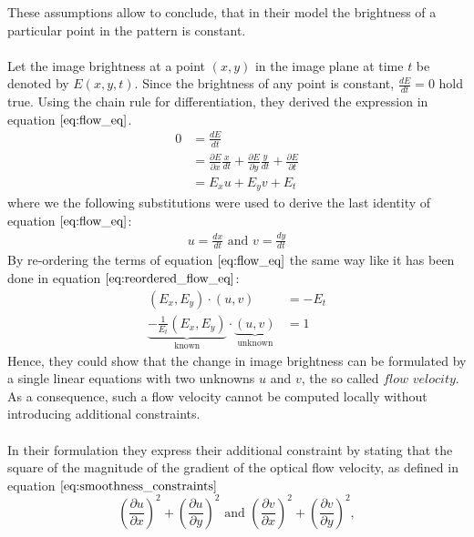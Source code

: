 These assumptions allow to conclude, that in their model the brightness of a particular point in the pattern is constant. \\ \\
Let the image brightness at a point $(x,y)$ in the image plane at time $t$ be denoted by $E(x,y,t)$. Since the brightness of any point is constant, $\frac{d E}{dt} = 0$ hold true. Using the chain rule for differentiation, they derived the expression in equation $\ref{eq:flow_eq}$.  
\begin{equation}
\begin{aligned}
0 &= \frac{d E}{dt} \\
&= \frac{\partial E}{\partial x} \frac{x}{dt} + \frac{\partial E}{\partial y} \frac{y}{dt} + \frac{\partial E}{\partial t} \\
&= E_{x} u + E_{y} v + E_{t}
\end{aligned}
\label{eq:flow_eq}	
\end{equation}
where we the following substitutions were used to derive the last identity of equation $\ref{eq:flow_eq}$:
\begin{equation}
\begin{aligned}
	u = \frac{dx}{dt} \text{ and } v = \frac{dy}{dt}
\end{aligned}
\end{equation}
By re-ordering the terms of equation $\ref{eq:flow_eq}$ the same way like it has been done in equation $\ref{eq:reordered_flow_eq}$:
\begin{equation}
\begin{aligned}
	(E_x, E_y) \cdot (u, v) &= -E_t \\
	\underbrace{-\frac{1}{E_t}\left( E_x, E_y \right)}_\text{known} \cdot \underbrace{(u, v)}_\text{unknown} &= 1
\end{aligned}
\label{eq:reordered_flow_eq}
\end{equation}
Hence, they could show that the change in image brightness can be formulated by a single linear equations with two unknowns $u$ and $v$, the so called $\textit{flow velocity}$. As a consequence, such a flow velocity cannot be computed locally without introducing additional constraints. \\ \\
In their formulation they express their additional constraint by stating that the square of the magnitude of the gradient of the optical flow velocity, as defined in equation $\ref{eq:smoothness_constraints}$
\begin{equation}
	\left( \frac{\partial u}{\partial x} \right)^2 + \left( \frac{\partial u}{\partial y} \right)^2 \text{ and } \left( \frac{\partial v}{\partial x} \right)^2 + \left( \frac{\partial v}{\partial y} \right)^2,
\label{eq:smoothness_constraints}
\end{equation}

